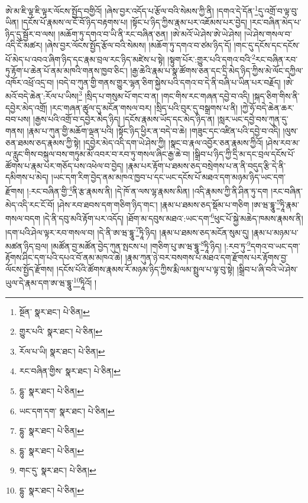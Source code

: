 ཨེ་མ་ཇི་ལྟ་ཇི་ལྟར་ལོངས་སྤྱོད་བགྱིའོ། །ཞེས་བྱར་འདོད་པ་རྩོལ་བའི་སེམས་ཀྱི་ནི། །དགའ་དེ་དོན་\footnote{སྔོན་  སྣར་ཐང་།  པེ་ཅིན། }དུ་འགྲོ་བ་ལྟ་བུ་ཡིན། །དངོས་པོ་རྣམས་ལ་ངོ་བོ་ཉིད་བརྟགས་པ། །སྟོང་པ་ཉིད་ཀྱིས་རྣམ་པར་འཇོམས་པར་བྱེད། །རང་བཞིན་མེད་པ་ཉིད་དུ་སྦྱོར་བ་ལས། །མཆོག་ཏུ་དགའ་བ་ཡི་ནི་རང་བཞིན་ཅན། །ཨེ་མའོ་ཡེ་ཤེས་ཨེ་ཡེ་ཤེས། །ཡེ་ཤེས་གསལ་བ་འདི་ངོ་མཚར། །ཞེས་བྱར་ལོངས་སྤྱོད་རྩོལ་བའི་སེམས། །མཆོག་ཏུ་དགའ་བ་ཙམ་ཉིད་དོ། །གང་དུ་དངོས་དང་དངོས་པོ་མེད་པ་འབའ་ཞིག་ཉིད་དང་རྣམ་བྲལ་རང་ཉིད་མཛེས་པ་སྟེ། །སྟུག་པོར་:གྱུར་པའི་དགའ་བའི་\footnote{གྱུར་པའི་  སྣར་ཐང་།  པེ་ཅིན། }རང་བཞིན་རབ་ཏུ་རྟོག་པ་ཆེན་པོ་ནམ་མཁའི་གནས་ཁྱབ་ཅིང་། །རྒྱ་ཆེའི་རྣམ་པ་སྣ་ཚོགས་ཅན་དང་དྲི་མེད་ཉིད་ཀྱིས་མེ་ལོང་དཀྱིལ་འཁོར་འཕྲོ་འདྲ་བ། །བདེ་བ་ཀུན་གྱི་གནས་གྱུར་ལྷན་ཅིག་སྐྱེས་པའི་དགའ་བ་དེ་ནི་བཞི་པ་ཡིན་པར་བརྗོད། །ཨེ་མའོ་བདེ་ཆེན་:རོལ་པ་ཡིས།\footnote{རོལ་པ་ཡི།  སྣར་ཐང་།  པེ་ཅིན། } །སྲིད་པ་གསུམ་པོ་གང་བ་ན། །གང་གིས་རང་གཞན་དབྱེ་བ་འདི། །སྐད་ཅིག་གིས་ནི་དབྱེར་མེད་འགྲོ། །རང་གཞན་ཚུལ་དུ་མངོན་གསལ་བར། །སྲིད་པའི་བུར་དུ་བསྒྲགས་པ་ནི། །ཀྱེ་ཧོ་བདེ་ཆེན་ཆར་བབ་པས། །རྒྱས་པའི་འགྲོ་བ་དབྱེར་མེད་ཉིད། །དངོས་རྣམས་ཡོད་དང་མེད་ཉིད་ན། །སླར་ཡང་དབྱེ་བས་ཀུན་དུ་གནས། །རྣམ་པ་ཀུན་གྱི་མཆོག་ལྡན་པའི། །སྟོང་ཉིད་ཕྱིར་ན་བདེ་བ་ཆེ། །གཟུང་དང་འཛིན་པའི་དབྱེ་བ་འདི། །ལུས་ཅན་ཐམས་ཅད་རྣམས་ཀྱི་སྟེ། །དབྱེར་མེད་འདི་དག་ཡེ་ཤེས་ཀྱི། །སྣང་བ་རྣལ་འབྱོར་ཅན་རྣམས་ཀྱིའོ། །ཤེས་རབ་མ་ལ་རླུང་གིས་བསྐུལ་བས་གཏུམ་མོ་འབར་བ་རབ་ཏུ་གསལ་ཞིང་རྒྱ་ཆེ་བ། །སྒྲིབ་པ་ཉིད་ཀྱི་དྲི་མ་དང་བྲལ་དངོས་པོ་ཚོགས་པ་རྣམ་པར་གཅོད་པས་འཕེལ་བ་བྱེད། །རྣམ་པར་རྟོག་པ་ཐམས་ཅད་བསྲེགས་པ་ན་ནི་བདུད་རྩི་དེ་ནི་དམིགས་པ་མེད། །ཡང་དག་རིག་བྱེད་ནམ་མཁའ་ཁྱབ་པ་དང་ཡང་དངོས་པོ་མཐའ་དག་མཉམ་ཉིད་ཡང་དག་རྫོགས། །:རང་བཞིན་གྱི་\footnote{རང་བཞིན་གྱིས་  སྣར་ཐང་།  པེ་ཅིན། }ནི་རྩ་རྣམས་ནི། །དེ་ཁོ་ན་ལས་ལྷ་རྣམས་མིན། །འདི་རྣམས་ཀྱི་ནི་ཤིན་ཏུ་དག །རང་བཞིན་མེད་འདི་རང་ངོ་བོ། །ཤེས་རབ་ཐབས་དག་གཅིག་ཉིད་གང་། །རྣམ་པ་ཐམས་ཅད་སྡོམ་པ་གཅིག །ཨ་ཝ་དྷཱུ་\footnote{དྷུ་  སྣར་ཐང་།  པེ་ཅིན། }ཏཱི་རྣམ་གསལ་བདག །དེ་ནི་དབུ་མའི་རྟོག་པར་འདོད། །ཐོག་མ་དབུས་མཐའ་:ཡང་དག་\footnote{ཡང་དག་དག་  སྣར་ཐང་།  པེ་ཅིན། }ཕུང་པོ་སྐྱེ་མཆེད་ཁམས་རྣམས་ནི། །དག་པའི་ཤེལ་ལྟར་རབ་གསལ་བ། །དེ་ནི་ཨ་ཝ་དྷཱུ་\footnote{དྷུ་  སྣར་ཐང་།  པེ་ཅིན། }ཏཱི་ཉིད། །རྣམ་པ་ཐམས་ཅད་མངོན་སུམ་དུ། །རྣམ་པ་མཉམ་པ་མཚན་ཉིད་བྲལ། །མཚོན་བྱ་མཚོན་བྱེད་ཀུན་སྤངས་པ། །གཅིག་པུ་ཨ་ཝ་དྷཱུ་\footnote{དྷུ་  སྣར་ཐང་།  པེ་ཅིན། }ཏཱི་ཉིད། །:རབ་ཏུ་\footnote{གང་དུ་  སྣར་ཐང་།  པེ་ཅིན། }དགའ་བ་ཡང་དག་རྟོགས་ཤིང་དག་པའི་དཔའ་བོ་ནམ་མཁའ་ཆེ། །རྣམ་ཀུན་ཉེ་བར་བསགས་པ་མཐའ་དག་རྫོགས་པར་རྟོགས་བྱ་ལོངས་སྤྱོད་རྫོགས། །དངོས་པོའི་ཚོགས་རྣམས་རོ་མཉམ་ཉིད་ཀྱིས་རྨི་ལམ་སྤྲུལ་པ་ལྟ་བུ་སྟེ། །སྒྲིབ་པ་ཞི་བའི་ཡེ་ཤེས་ཡུལ་དེ་རྣམ་དག་ཨ་ཝ་དྷཱུ་\footnote{དྷུ་  སྣར་ཐང་།  པེ་ཅིན། }ཏཱིའོ། །
